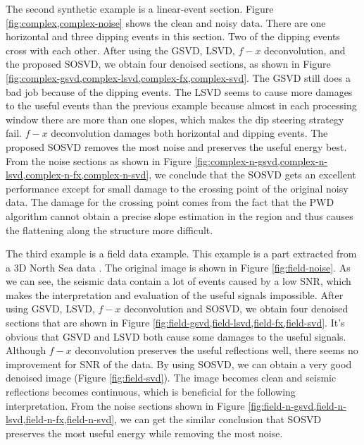 The second synthetic example is a linear-event section. Figure \ref{fig:complex,complex-noise} shows the clean and noisy data. There are one horizontal and three dipping events in this section. Two of the dipping events cross with each other. After using the GSVD, LSVD, $f-x$ deconvolution, and the proposed SOSVD, we obtain four denoised sections, as shown in Figure \ref{fig:complex-gsvd,complex-lsvd,complex-fx,complex-svd}. The GSVD still does a bad job because of the dipping events. The LSVD seems to cause more damages to the useful events than the previous example because almost in each processing window there are more than one slopes, which makes the dip steering strategy fail. $f-x$ deconvolution damages both horizontal and dipping events. The proposed SOSVD removes the most noise and preserves the useful energy best. From the noise sections as shown in Figure \ref{fig:complex-n-gsvd,complex-n-lsvd,complex-n-fx,complex-n-svd}, we conclude that the SOSVD gets an excellent performance except for small damage to the crossing point of the original noisy data. The damage for the crossing point comes from the fact that the PWD algorithm cannot obtain a precise slope estimation in the region and thus causes the flattening along the structure more difficult. 
 
The third example is a field data example. This example is a part extracted from a 3D North Sea data \cite[]{lomask2006,fomel2010painting}.  The original image is shown in Figure \ref{fig:field-noise}. As we can see, the seismic data contain a lot of  events caused by a low SNR, which makes the interpretation and evaluation of the useful signals impossible. After using GSVD, LSVD, $f-x$ deconvolution and SOSVD, we obtain four denoised sections that are shown in Figure \ref{fig:field-gsvd,field-lsvd,field-fx,field-svd}. It's obvious that GSVD and LSVD both cause some damages to the useful signals. Although $f-x$ deconvolution preserves the useful reflections well, there seems no improvement for SNR of the data. By using SOSVD, we can obtain a very good denoised image (Figure \ref{fig:field-svd}). The image becomes clean and seismic reflections becomes continuous, which is beneficial for the following interpretation. From the noise sections shown in Figure \ref{fig:field-n-gsvd,field-n-lsvd,field-n-fx,field-n-svd}, we can get the similar conclusion that  SOSVD preserves the most useful energy while removing the most noise.

